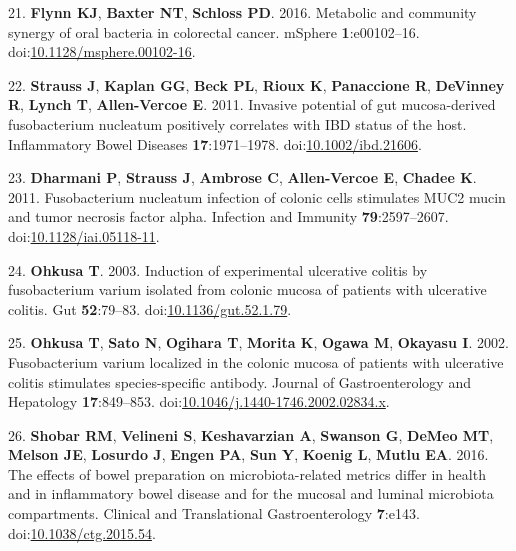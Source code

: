 \documentclass[11pt,]{article}
\begin{document}
\hypertarget{ref-Flynn2016}{}
21. \textbf{Flynn KJ}, \textbf{Baxter NT}, \textbf{Schloss PD}. 2016.
Metabolic and community synergy of oral bacteria in colorectal cancer.
mSphere \textbf{1}:e00102--16.
doi:\href{https://doi.org/10.1128/msphere.00102-16}{10.1128/msphere.00102-16}.

\hypertarget{ref-Strauss2011}{}
22. \textbf{Strauss J}, \textbf{Kaplan GG}, \textbf{Beck PL},
\textbf{Rioux K}, \textbf{Panaccione R}, \textbf{DeVinney R},
\textbf{Lynch T}, \textbf{Allen-Vercoe E}. 2011. Invasive potential of
gut mucosa-derived fusobacterium nucleatum positively correlates with
IBD status of the host. Inflammatory Bowel Diseases
\textbf{17}:1971--1978.
doi:\href{https://doi.org/10.1002/ibd.21606}{10.1002/ibd.21606}.

\hypertarget{ref-Dharmani2011}{}
23. \textbf{Dharmani P}, \textbf{Strauss J}, \textbf{Ambrose C},
\textbf{Allen-Vercoe E}, \textbf{Chadee K}. 2011. Fusobacterium
nucleatum infection of colonic cells stimulates MUC2 mucin and tumor
necrosis factor alpha. Infection and Immunity \textbf{79}:2597--2607.
doi:\href{https://doi.org/10.1128/iai.05118-11}{10.1128/iai.05118-11}.

\hypertarget{ref-Ohkusa2003}{}
24. \textbf{Ohkusa T}. 2003. Induction of experimental ulcerative
colitis by fusobacterium varium isolated from colonic mucosa of patients
with ulcerative colitis. Gut \textbf{52}:79--83.
doi:\href{https://doi.org/10.1136/gut.52.1.79}{10.1136/gut.52.1.79}.

\hypertarget{ref-Ohkusa2002}{}
25. \textbf{Ohkusa T}, \textbf{Sato N}, \textbf{Ogihara T},
\textbf{Morita K}, \textbf{Ogawa M}, \textbf{Okayasu I}. 2002.
Fusobacterium varium localized in the colonic mucosa of patients with
ulcerative colitis stimulates species-specific antibody. Journal of
Gastroenterology and Hepatology \textbf{17}:849--853.
doi:\href{https://doi.org/10.1046/j.1440-1746.2002.02834.x}{10.1046/j.1440-1746.2002.02834.x}.

\hypertarget{ref-Shobar2016}{}
26. \textbf{Shobar RM}, \textbf{Velineni S}, \textbf{Keshavarzian A},
\textbf{Swanson G}, \textbf{DeMeo MT}, \textbf{Melson JE},
\textbf{Losurdo J}, \textbf{Engen PA}, \textbf{Sun Y}, \textbf{Koenig
L}, \textbf{Mutlu EA}. 2016. The effects of bowel preparation on
microbiota-related metrics differ in health and in inflammatory bowel
disease and for the mucosal and luminal microbiota compartments.
Clinical and Translational Gastroenterology \textbf{7}:e143.
doi:\href{https://doi.org/10.1038/ctg.2015.54}{10.1038/ctg.2015.54}.
\end{document}
